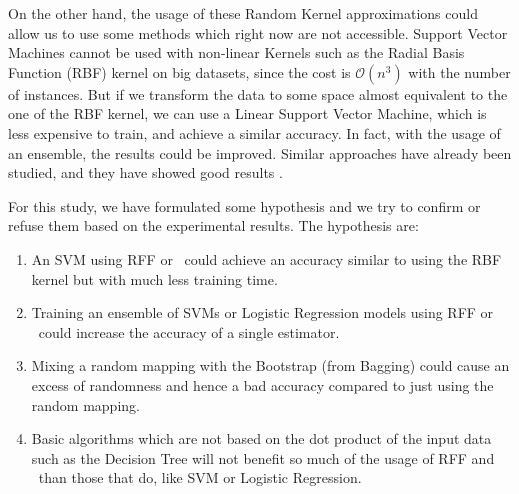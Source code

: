 \begin{pre-delivery}
  On the other hand, the usage of these Random Kernel approximations could
  allow us to use some methods which right now are not accessible. Support
  Vector Machines cannot be used with non-linear Kernels such as the Radial
  Basis Function (RBF) kernel on big datasets, since the cost is
  $\mathcal{O}(n^3)$
  with the number of instances.
  But if
  we transform the data to some space almost equivalent to the one of the
  RBF kernel, we can use a Linear Support Vector Machine, which is less
  expensive to train, and achieve a similar accuracy. In fact, with the usage
  of an ensemble, the results could be improved. Similar approaches have
  already been studied, and they have showed good results \cite{svm_rff}
  \cite{Zhang2017StackedKN} \cite{rahimi2008random}.

  For this study, we have formulated some hypothesis and we try to confirm or
  refuse them based on the experimental results. The hypothesis are:
  \begin{enumerate}
    \item An SVM using RFF or \Nys\ could achieve an accuracy similar to
    using the RBF kernel but with much less training time.
    \item Training an ensemble of SVMs or Logistic Regression models using
    RFF or \Nys\ could increase the accuracy of a single estimator.
    \item Mixing a random mapping with the Bootstrap (from Bagging) could cause
    an excess of randomness and hence a bad accuracy compared to just using
    the random mapping.
    \item Basic algorithms which are not based on the dot product of the
    input data such as the Decision Tree will not benefit so much of the
    usage of RFF and \Nys\ than those that do, like SVM or
    Logistic Regression.
  \end{enumerate}


\end{pre-delivery}
